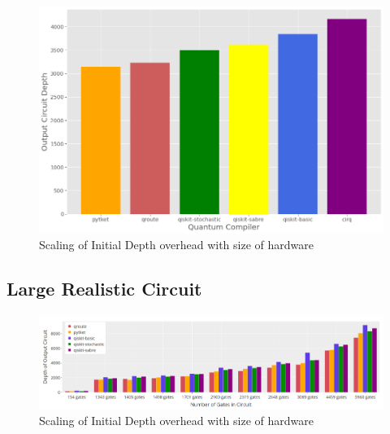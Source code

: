 \documentclass[%
 reprint,
 amsmath,amssymb,
 aps,
]{revtex4-2}
\begin{document}
\begin{figure}[H]
    \includegraphics[width=\linewidth]{images/results-small.png}
    \caption{\label{fig:results-small}
        Scaling of Initial Depth overhead with size of hardware}
\end{figure}


\subsection{\label{sec:results-realistic}Large Realistic Circuit}

\begin{figure}[t]
    \includegraphics[width=\linewidth]{images/results-large.png}
    \caption{\label{fig:results-small}
        Scaling of Initial Depth overhead with size of hardware}
\end{figure}
\end{document}
